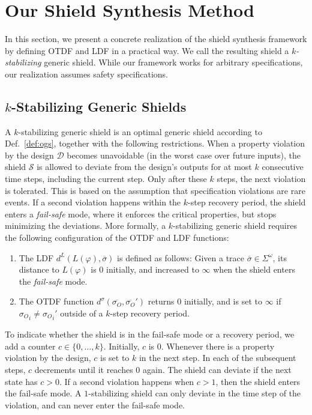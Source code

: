 \documentclass{llncs}
\newcommand{\design}{\mathcal{D}}
\newcommand{\shield}{\mathcal{S}}
\newcommand{\doutletter}{{\sigma_O}}
\newcommand{\douttrace}{{\overline{\sigma_O}}}
\newcommand{\dalph}{\Sigma}
\newcommand{\dletter}{\sigma}
\newcommand{\dtrace}{\overline{\dletter}}
\newcommand{\lang}{L}
\newcommand{\spec}{\varphi}
\newcommand{\distt}{d^\sigma}
\newcommand{\distl}{d^L}
\begin{document}
\section{Our Shield Synthesis Method}
\label{sec:sol}

In this section, we present a concrete realization of the shield 
synthesis framework by defining OTDF and LDF in a practical way. We call 
the resulting shield a \emph{$k$-stabilizing} generic shield. While our 
framework works for arbitrary specifications, our realization assumes 
safety specifications.  

\subsection{$k$-Stabilizing Generic Shields}

A $k$-stabilizing generic shield is an optimal generic shield according 
to Def.~\ref{def:ogs}, together with the following restrictions.  When a 
property violation by the design $\design$ becomes unavoidable (in the 
worst case over future inputs), the shield $\shield$ is allowed to 
deviate from the design's outputs for at most $k$ consecutive time 
steps, including the current step.  Only after these $k$ steps, the next 
violation is tolerated. This is based on the assumption that 
specification violations are rare events.  If a second violation happens 
within the $k$-step recovery period, the shield enters a 
\emph{fail-safe} mode, where it enforces the critical properties, but 
stops minimizing the deviations.  
More formally, a $k$-stabilizing generic shield requires the following 
configuration of the OTDF and LDF functions:
\begin{enumerate}
\item The LDF $\distl(\lang(\spec),\dtrace) $ is defined as follows: 
  Given a trace $\dtrace \in \dalph^\omega$, its distance to
  $\lang(\spec)$ is $0$ initially, and increased to $\infty$ when the 
  shield enters the \emph{fail-safe} mode.
\item The OTDF function $\distt(\douttrace, \douttrace')$ returns $0$
  initially, and is set to $\infty$ if $\doutletter_i \neq 
  \doutletter_i'$ outside of a $k$-step recovery period.
\end{enumerate}
To indicate whether the shield is in the fail-safe mode or a recovery 
period, we add  a counter $c\in \{0,\ldots,k\}$. Initially, $c$ is 0. 
Whenever there is a property violation by the design, $c$ is set to $k$ 
in the next step.  In each of the subsequent steps, $c$ decrements until 
it reaches 0 again. The shield can deviate if the next state has $c>0$.  
If a second violation happens when $c>1$, then the shield enters the 
fail-safe mode.  A $1$-stabilizing shield can only deviate in the 
time step of the violation, and can never enter the fail-safe mode.
\end{document}
